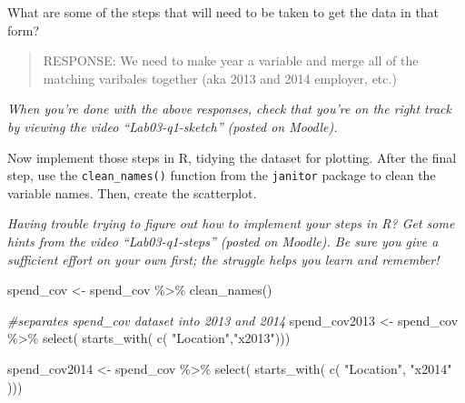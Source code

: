 \documentclass[
]{article}
\newenvironment{Shaded}{\begin{snugshade}}{\end{snugshade}}
\newcommand{\CommentTok}[1]{\textcolor[rgb]{0.56,0.35,0.01}{\textit{#1}}}
\newcommand{\FunctionTok}[1]{\textcolor[rgb]{0.00,0.00,0.00}{#1}}
\newcommand{\NormalTok}[1]{#1}
\newcommand{\OtherTok}[1]{\textcolor[rgb]{0.56,0.35,0.01}{#1}}
\newcommand{\SpecialCharTok}[1]{\textcolor[rgb]{0.00,0.00,0.00}{#1}}
\newcommand{\StringTok}[1]{\textcolor[rgb]{0.31,0.60,0.02}{#1}}
\begin{document}
What are some of the steps that will need to be taken to get the data in
that form?

\begin{quote}
RESPONSE: We need to make year a variable and merge all of the matching
varibales together (aka 2013 and 2014 employer, etc.)
\end{quote}

\emph{When you're done with the above responses, check that you're on
the right track by viewing the video ``Lab03-q1-sketch'' (posted on
Moodle).}

Now implement those steps in R, tidying the dataset for plotting. After
the final step, use the \texttt{clean\_names()} function from the
\texttt{janitor} package to clean the variable names. Then, create the
scatterplot.

\emph{Having trouble trying to figure out how to implement your steps in
R? Get some hints from the video ``Lab03-q1-steps'' (posted on Moodle).
Be sure you give a sufficient effort on your own first; the struggle
helps you learn and remember!}

\begin{Shaded}
\begin{Highlighting}[]
\NormalTok{spend\_cov }\OtherTok{\textless{}{-}}\NormalTok{ spend\_cov }\SpecialCharTok{\%\textgreater{}\%}
  \FunctionTok{clean\_names}\NormalTok{()}

\CommentTok{\#separates spend\_cov dataset into 2013 and 2014 }
\NormalTok{spend\_cov2013 }\OtherTok{\textless{}{-}}\NormalTok{ spend\_cov }\SpecialCharTok{\%\textgreater{}\%}
  \FunctionTok{select}\NormalTok{( }\FunctionTok{starts\_with}\NormalTok{( }\FunctionTok{c}\NormalTok{( }\StringTok{"Location"}\NormalTok{,}\StringTok{"x2013"}\NormalTok{))) }

\NormalTok{spend\_cov2014 }\OtherTok{\textless{}{-}}\NormalTok{ spend\_cov }\SpecialCharTok{\%\textgreater{}\%}
  \FunctionTok{select}\NormalTok{( }\FunctionTok{starts\_with}\NormalTok{( }\FunctionTok{c}\NormalTok{( }\StringTok{"Location"}\NormalTok{, }\StringTok{"x2014"}\NormalTok{ )))}
\end{Highlighting}
\end{Shaded}
\end{document}
